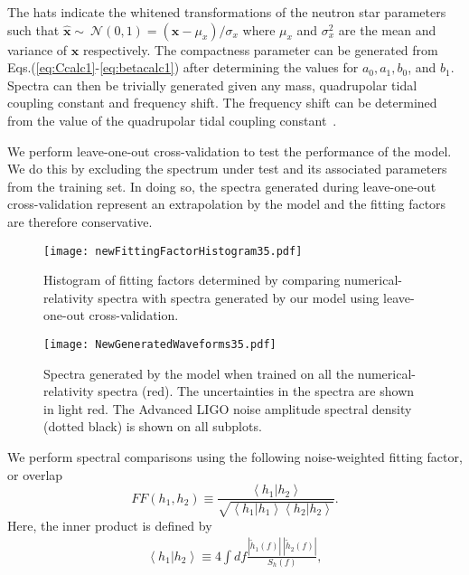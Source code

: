 \documentclass[../Thesis.tex]{subfiles}
\begin{document}
       \noindent The hats indicate the whitened transformations of the neutron star parameters such that $\widehat{\mathbf{x}}\sim~ \mathcal{N}(0,1)=( \mathbf{x}-\mu_x)/\sigma_x$ where $\mu_x$ and $\sigma_x^2$ are the mean and variance of $\mathbf{x}$ respectively. The compactness parameter can be generated from Eqs.(\ref{eq:Ccalc1}-\ref{eq:betacalc1}) after determining the values for $a_0, a_1, b_0$, and $b_1$. Spectra can then be trivially generated given any mass, quadrupolar tidal coupling constant and frequency shift. The frequency shift can be determined from the value of the quadrupolar tidal coupling constant~\cite{Bernuzzi2015,Takami2015}. \par
       We perform leave-one-out cross-validation to test the performance of the model. We do this by excluding the spectrum under test and its associated parameters from the training set. In doing so, the spectra generated during leave-one-out cross-validation represent an extrapolation by the model  and the fitting factors are therefore conservative.
       \par
    \begin{figure}[H]
          \texttt{[image: newFittingFactorHistogram35.pdf]}  
          \caption{Histogram of fitting factors determined by comparing numerical-relativity spectra with spectra generated by our model using leave-one-out cross-validation.}
          \label{fig:FittingFactorsHistogram}
    \end{figure}   
    \begin{figure*}
        \texttt{[image: NewGeneratedWaveforms35.pdf]} 
        \caption{ Spectra generated by the model when trained on all the numerical-relativity spectra (red). The uncertainties in the spectra are shown in light red. The Advanced LIGO noise amplitude spectral density (dotted black) is shown on all subplots.}
        \label{fig:GeneratedWaveforms}
    \end{figure*}      
       We perform spectral comparisons using the following noise-weighted fitting factor, or overlap~\cite{Apostolatos95}
        \begin{equation}
        	FF(h_{1},h_{2})\equiv\frac{\left<h_{1}|h_{2}\right>}{\sqrt{\left<h_{1}|h_{1}\right>\left<h_{2}|h_{2}\right>}}.\label{eq:FF1}
        \end{equation}
        Here, the inner product is defined by
        \begin{align}
        	\left<h_1|h_2\right>\equiv4 \int df\frac{|\tilde{h}_1(f)|\ |\tilde{h}_2(f)|}{S_h(f)},
        \end{align}
\end{document}
